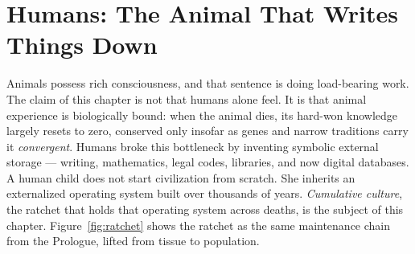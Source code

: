 \chapter{Humans: The Animal That Writes Things Down}

Animals possess rich consciousness, and that sentence is doing load-bearing work. The claim of this chapter is not that humans alone feel. It is that animal experience is biologically bound: when the animal dies, its hard-won knowledge largely resets to zero, conserved only insofar as genes and narrow traditions carry it \textit{convergent}. Humans broke this bottleneck by inventing symbolic external storage --- writing, mathematics, legal codes, libraries, and now digital databases. A human child does not start civilization from scratch. She inherits an externalized operating system built over thousands of years. \textit{Cumulative culture}, the ratchet that holds that operating system across deaths, is the subject of this chapter. Figure~\ref{fig:ratchet} shows the ratchet as the same maintenance chain from the Prologue, lifted from tissue to population.

